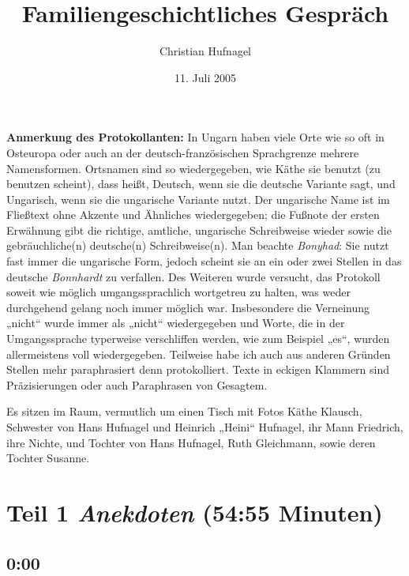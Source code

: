 \documentclass[ngerman,]{article}
\title{Familiengeschichtliches Gespräch}
\author{Christian Hufnagel}
\date{11. Juli 2005}
\begin{document}
	
					\maketitle
		
		

		{
				\setcounter{tocdepth}{3}
		\tableofcontents
					\clearpage
			}
	
\begin{multicols}{2}
\textbf{Anmerkung des Protokollanten:} In Ungarn haben viele Orte wie so
oft in Osteuropa oder auch an der deutsch-französischen Sprachgrenze
mehrere Namensformen. Ortsnamen sind so wiedergegeben, wie Käthe sie
benutzt (zu benutzen scheint), dass heißt, Deutsch, wenn sie die
deutsche Variante sagt, und Ungarisch, wenn sie die ungarische Variante
nutzt. Der ungarische Name ist im Fließtext ohne Akzente und Ähnliches
wiedergegeben; die Fußnote der ersten Erwähnung gibt die richtige,
amtliche, ungarische Schreibweise wieder sowie die gebräuchliche(n)
deutsche(n) Schreibweise(n). Man beachte \emph{Bonyhad}: Sie nutzt fast
immer die ungarische Form, jedoch scheint sie an ein oder zwei Stellen
in das deutsche \emph{Bonnhardt} zu verfallen. Des Weiteren wurde
versucht, das Protokoll soweit wie möglich umgangssprachlich wortgetreu
zu halten, was weder durchgehend gelang noch immer möglich war.
Insbesondere die Verneinung „nicht“ wurde immer als „nicht“
wiedergegeben und Worte, die in der Umgangssprache typerweise
verschliffen werden, wie zum Beispiel „es“, wurden allermeistens voll
wiedergegeben. Teilweise habe ich auch aus anderen Gründen Stellen mehr
paraphrasiert denn protokolliert. Texte in eckigen Klammern sind
Präzisierungen oder auch Paraphrasen von Gesagtem.

Es sitzen im Raum, vermutlich um einen Tisch mit Fotos Käthe Klausch,
Schwester von Hans Hufnagel und Heinrich „Heini“ Hufnagel, ihr Mann
Friedrich, ihre Nichte, und Tochter von Hans Hufnagel, Ruth Gleichmann,
sowie deren Tochter Susanne.

\hypertarget{anekdoten}{%
\section{\texorpdfstring{Teil 1 \emph{Anekdoten} (54:55
Minuten)}{Teil 1 Anekdoten (54:55 Minuten)}}\label{anekdoten}}

\hypertarget{section}{%
\subsection{0:00}\label{section}}


\end{multicols}
\end{document}
